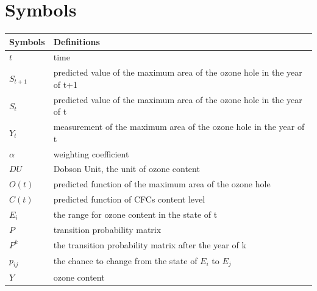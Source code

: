 \documentclass[12pt]{article}
\begin{document}
\section{Symbols}

\begin{tabular}{ll}
\hline
Symbols&Definitions\\
\hline
$t$& time\\
$S_{t+1}$& predicted value of the maximum area of the ozone hole in the year of t+1\\
$S_t$& predicted value of the maximum area of the ozone hole in the year of t\\
$Y_t$& measurement of the maximum area of the ozone hole in the year of t\\
$\alpha$& weighting coefficient\\
$DU$&Dobson Unit, the unit of ozone content\\
$O(t)$& predicted function of the maximum area of the ozone hole\\
$C(t)$& predicted function of CFCs content level\\
$E_i$& the range for ozone content in the state of t\\
$P$& transition probability matrix\\
$P^k$& the transition probability matrix after the year of k\\
$p_{ij}$& the chance to change from the state of $E_i$ to $E_j$\\
$Y$& ozone content\\
\hline
\end{tabular}


\end{document}
